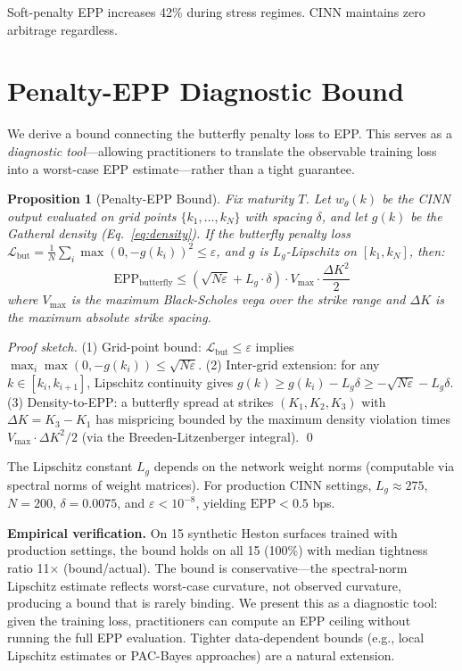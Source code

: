 \documentclass[11pt,a4paper]{article}
\newtheorem{proposition}[theorem]{Proposition}
\newcommand{\loss}{\mathcal{L}}
\begin{document}
Soft-penalty EPP increases 42\% during stress regimes. CINN maintains zero arbitrage regardless.

\section{Penalty-EPP Diagnostic Bound}
\label{app:bound}

We derive a bound connecting the butterfly penalty loss to EPP. This serves as a \textit{diagnostic tool}---allowing practitioners to translate the observable training loss into a worst-case EPP estimate---rather than a tight guarantee.

\begin{proposition}[Penalty-EPP Bound]
\label{prop:epp_bound}
Fix maturity $T$. Let $w_\theta(k)$ be the CINN output evaluated on grid points $\{k_1, \ldots, k_N\}$ with spacing $\delta$, and let $g(k)$ be the Gatheral density (Eq.~\ref{eq:density}). If the butterfly penalty loss $\loss_{\text{but}} = \frac{1}{N}\sum_i \max(0, -g(k_i))^2 \leq \varepsilon$, and $g$ is $L_g$-Lipschitz on $[k_1, k_N]$, then:
\begin{equation}
    \text{EPP}_{\text{butterfly}} \leq \left(\sqrt{N\varepsilon} + L_g \cdot \delta\right) \cdot V_{\max} \cdot \frac{\Delta K^2}{2}
\end{equation}
where $V_{\max}$ is the maximum Black-Scholes vega over the strike range and $\Delta K$ is the maximum absolute strike spacing.
\end{proposition}

\textit{Proof sketch.} (1) Grid-point bound: $\loss_{\text{but}} \leq \varepsilon$ implies $\max_i \max(0, -g(k_i)) \leq \sqrt{N\varepsilon}$. (2) Inter-grid extension: for any $k \in [k_i, k_{i+1}]$, Lipschitz continuity gives $g(k) \geq g(k_i) - L_g \delta \geq -\sqrt{N\varepsilon} - L_g\delta$. (3) Density-to-EPP: a butterfly spread at strikes $(K_1, K_2, K_3)$ with $\Delta K = K_3 - K_1$ has mispricing bounded by the maximum density violation times $V_{\max} \cdot \Delta K^2 / 2$ (via the Breeden-Litzenberger integral). \qed

The Lipschitz constant $L_g$ depends on the network weight norms (computable via spectral norms of weight matrices). For production CINN settings, $L_g \approx 275$, $N = 200$, $\delta = 0.0075$, and $\varepsilon < 10^{-8}$, yielding $\text{EPP} < 0.5$ bps.

\textbf{Empirical verification.} On 15 synthetic Heston surfaces trained with production settings, the bound holds on all 15 (100\%) with median tightness ratio 11$\times$ (bound/actual). The bound is conservative---the spectral-norm Lipschitz estimate reflects worst-case curvature, not observed curvature, producing a bound that is rarely binding. We present this as a diagnostic tool: given the training loss, practitioners can compute an EPP ceiling without running the full EPP evaluation. Tighter data-dependent bounds (e.g., local Lipschitz estimates or PAC-Bayes approaches) are a natural extension.
\end{document}
